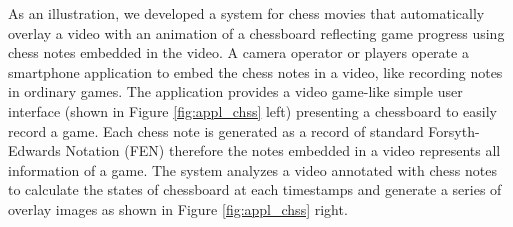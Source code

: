 As an illustration, we developed a system for chess movies that automatically overlay a video with an animation of a chessboard reflecting game progress using chess notes embedded in the video.
A camera operator or players operate a smartphone application to embed the chess notes in a video, like recording notes in ordinary games.
The application provides a video game-like simple user interface (shown in Figure \ref{fig:appl_chss} left) presenting a chessboard to easily record a game.
Each chess note is generated as a record of standard Forsyth-Edwards Notation (FEN) therefore the notes embedded in a video represents all information of a game.
The system analyzes a video annotated with chess notes to calculate the states of chessboard at each timestamps and generate a series of overlay images as shown in Figure \ref{fig:appl_chss} right.
